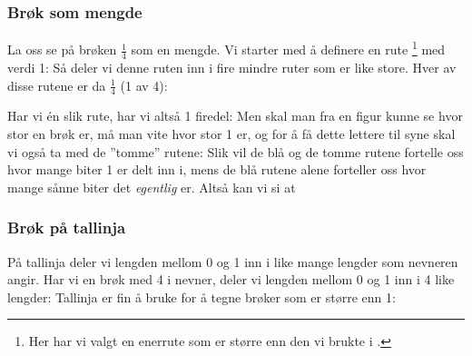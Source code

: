 




\section{\brgrpr \label{brgrpr}}
\vsk

\newpage
\subsubsection{Brøk som mengde}
La oss se på brøken 
$ \frac{1}{4} $
som en mengde. Vi starter med å definere en rute\!\!
\footnote{Her har vi valgt en enerrute som er større enn den vi brukte i .}
 med verdi 1: 
Så  deler vi denne ruten inn i fire mindre ruter som er like store. Hver av disse rutene er da
$ \frac{1}{4} $
(1 av 4):

Har vi én slik rute, har vi altså 1 firedel:
Men skal man fra en figur kunne se hvor stor en brøk er, må man vite hvor stor 1 er, og for å få dette lettere til syne skal vi også ta med de ''tomme'' rutene:
\newpage
Slik vil de blå og de tomme rutene fortelle oss hvor mange biter 1 er delt inn i, mens de blå rutene alene forteller oss hvor mange sånne biter det \textsl{egentlig} er. Altså kan vi si at\regv
 
\st{ \vs
{}
}

\subsubsection{Brøk på tallinja}
På tallinja deler vi lengden mellom 0 og 1 inn i like mange lengder som nevneren angir. Har vi en brøk med 4 i nevner, deler vi lengden mellom 0 og 1 inn i 4 like lengder:
Tallinja er fin å bruke for å tegne brøker som er større enn 1:
